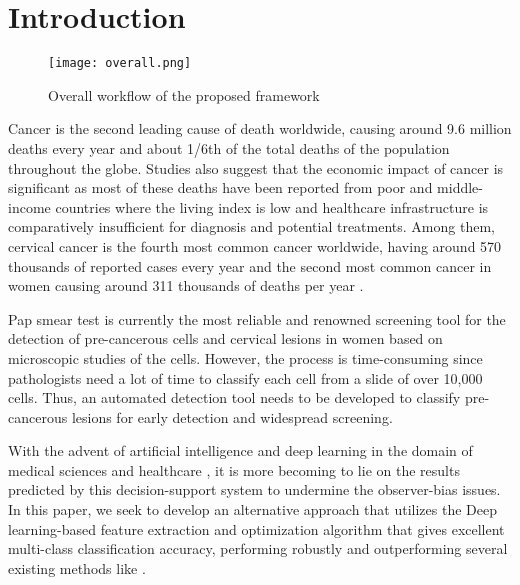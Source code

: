 \documentclass{llncs}
\begin{document}
\section{Introduction}
\begin{figure*}
\begin{adjustwidth}{-2cm}{}
    \centering
    \texttt{[image: overall.png]}
    \caption{Overall workflow of the proposed framework}
    \label{overall}
\end{adjustwidth}
\end{figure*}
Cancer is the second leading cause of death worldwide, causing around 9.6 million deaths every year and about 1/6th of the total deaths of the population throughout the globe. Studies also suggest that the economic impact of cancer is significant as most of these deaths have been reported from poor and middle-income countries where the living index is low and healthcare infrastructure is comparatively insufficient for diagnosis and potential treatments. Among them, cervical cancer is the fourth most common cancer worldwide, having around 570 thousands of reported cases every year and the second most common cancer in women causing around 311 thousands of deaths per year \cite{ferlay2019estimating}.

Pap smear test is currently the most reliable and renowned screening tool for the detection of pre-cancerous cells and cervical lesions in women based on microscopic studies of the cells. However, the process is time-consuming since pathologists need a lot of time to classify each cell from a slide of over 10,000 cells. Thus, an automated detection tool needs to be developed to classify pre-cancerous lesions for early detection and widespread screening.

With the advent of artificial intelligence and deep learning in the domain of medical sciences and healthcare \cite{basak2020comparative, basak2021dfenet,basak2020monocular}, it is more becoming to lie on the results predicted by this decision-support system \cite{basak2020single,chattopadhyay2020multi} to undermine the observer-bias issues. In this paper, we seek to develop an alternative approach that utilizes the Deep learning-based feature extraction and optimization algorithm that gives excellent multi-class classification accuracy, performing robustly and outperforming several existing methods like \cite{gencctav2012unsupervised, win2020computer, chankong2014automatic, bora2017automated, Mitra2019,mitra2020cytology, Dey2020}.
\end{document}
